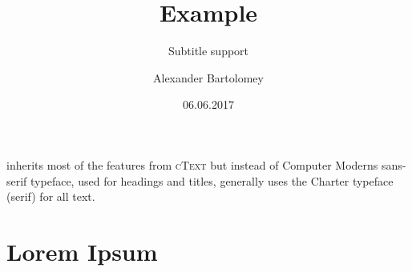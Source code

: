 \documentclass{etext}
\title{\etext Example}
\subtitle{Subtitle support}
\author{Alexander Bartolomey}
\date{06.06.2017}
\begin{document}
\maketitle
\etext inherits most of the features from \textsc{cText} but instead of Computer Moderns sans-serif typeface, used for headings and titles, generally uses the Charter typeface (serif) for all text.
\section{Lorem Ipsum}
\lipsum[1-13]
\end{document}
